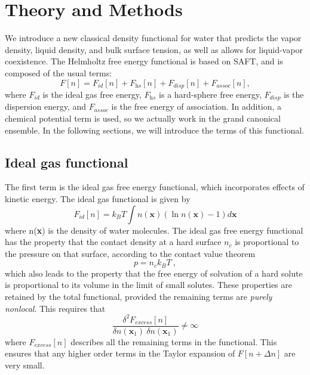 \documentclass[letterpaper,twocolumn,amsmath,amssymb,prb]{revtex4-1}
\newcommand{\xx}{\textbf{x}}
\begin{document}
\section{Theory and Methods}
We introduce a new classical density functional for water that
predicts the vapor density, liquid density, and bulk surface tension, as well 
as allows for liquid-vapor coexistence.  The Helmholtz free energy functional is
based on SAFT, and is composed of the usual terms:
\begin{equation}
  F[n] = F_\textit{id}[n] + F_\textit{hs}[n]  +
F_\textit{disp}[n]+ F_\textit{assoc}[n],
\end{equation}
where $F_\textit{id}$ is the ideal gas free energy, $F_\textit{hs}$ is
a hard-sphere free energy, $F_\textit{disp}$ is the dispersion energy,
and $F_\textit{assoc}$ is the free energy of association.  In
addition, a chemical potential term is used, so we actually work in
the grand canonical ensemble.  In the following sections, we will
introduce the terms of this functional.

\subsection{Ideal gas functional}
The first term is the ideal gas free energy functional,
which incorporates effects of kinetic energy.  The ideal gas
functional is given by
\begin{equation}\label{idealgas}
  F_{id}[n] = k_B T \int n(\xx)\left( \ln{n(\xx)} - 1\right) d\xx
\end{equation}
where n(\xx) is the density of water molecules.  The ideal gas free
energy functional has the property that the contact density at a hard
surface $n_c$ is proportional to the pressure on that surface,
according to the contact value theorem
\begin{equation}\label{contactvaluethm}
  p = n_c k_BT \:,
\end{equation}
which also leads to the property that the free energy of solvation of
a hard solute is proportional to its volume in the limit of small
solutes.  These properties are retained by the total functional,
provided the remaining terms are \emph{purely nonlocal}. This requires
that
\begin{equation}
 \frac{\delta^2F_{\textit{excess}}[n]}{\delta n(\xx_1)~\delta n(\xx_1)}\neq\infty
\end{equation}
where $F_{\textit{excess}}[n]$ describes all the remaining terms in the functional.
This ensures that any higher order terms in the Taylor expansion
of $F[n+\Delta n]$ are very small.
\end{document}
